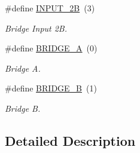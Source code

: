 \begin{DoxyCompactItemize}
\mbox{\label{group___l6206___private___constants_ga804913058913286ed1d220c1a7bb5dc6}} 
\#define \mbox{\hyperlink{group___l6206___private___constants_ga804913058913286ed1d220c1a7bb5dc6}{I\+N\+P\+U\+T\+\_\+2B}}~(3)
\begin{DoxyCompactList}\small\item\em Bridge Input 2B. \end{DoxyCompactList}\item 
\mbox{\label{group___l6206___private___constants_ga6c4cc18f6e8546b4fa56edc3e38e8c05}} 
\#define \mbox{\hyperlink{group___l6206___private___constants_ga6c4cc18f6e8546b4fa56edc3e38e8c05}{B\+R\+I\+D\+G\+E\+\_\+A}}~(0)
\begin{DoxyCompactList}\small\item\em Bridge A. \end{DoxyCompactList}\item 
\mbox{\label{group___l6206___private___constants_ga0a10d19ba9b300754131ebf5a81f73bf}} 
\#define \mbox{\hyperlink{group___l6206___private___constants_ga0a10d19ba9b300754131ebf5a81f73bf}{B\+R\+I\+D\+G\+E\+\_\+B}}~(1)
\begin{DoxyCompactList}\small\item\em Bridge B. \end{DoxyCompactList}\end{DoxyCompactItemize}


\subsection{Detailed Description}
